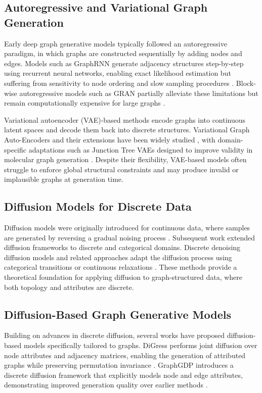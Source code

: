 \subsection{Autoregressive and Variational Graph Generation}

Early deep graph generative models typically followed an autoregressive paradigm, in which graphs are constructed sequentially by adding nodes and edges. Models such as GraphRNN generate adjacency structures step-by-step using recurrent neural networks, enabling exact likelihood estimation but suffering from sensitivity to node ordering and slow sampling procedures \cite{you2018graphrnn}. Block-wise autoregressive models such as GRAN partially alleviate these limitations but remain computationally expensive for large graphs \cite{liao2019gran}.

Variational autoencoder (VAE)-based methods encode graphs into continuous latent spaces and decode them back into discrete structures. Variational Graph Auto-Encoders and their extensions have been widely studied \cite{kipf2016vgae}, with domain-specific adaptations such as Junction Tree VAEs designed to improve validity in molecular graph generation \cite{jin2018junction}. Despite their flexibility, VAE-based models often struggle to enforce global structural constraints and may produce invalid or implausible graphs at generation time.

\subsection{Diffusion Models for Discrete Data}

Diffusion models were originally introduced for continuous data, where samples are generated by reversing a gradual noising process \cite{ho2020ddpm}. Subsequent work extended diffusion frameworks to discrete and categorical domains. Discrete denoising diffusion models and related approaches adapt the diffusion process using categorical transitions or continuous relaxations \cite{hoogeboom2021discrete,austin2021structured}. These methods provide a theoretical foundation for applying diffusion to graph-structured data, where both topology and attributes are discrete.

\subsection{Diffusion-Based Graph Generative Models}

Building on advances in discrete diffusion, several works have proposed diffusion-based models specifically tailored to graphs. DiGress performs joint diffusion over node attributes and adjacency matrices, enabling the generation of attributed graphs while preserving permutation invariance \cite{vignac2022digress}. GraphGDP introduces a discrete diffusion framework that explicitly models node and edge attributes, demonstrating improved generation quality over earlier methods \cite{kong2023graphgdp}.

